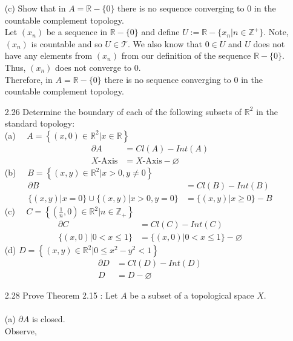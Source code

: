 \documentclass[12pt]{article}
\newcommand{\R}{\mathbb{R}}
\newcommand{\Z}{\mathbb{Z}}
\newcommand{\TT}{\mathcal{T}}
\begin{document}
\begin{enumerate}
		(c) Show that in $A=\R-\{0\}$ there is no sequence converging to 0 in the countable complement topology.\\
		Let $ (x_n) $ be a sequence in $ \R-\{0\} $ and define $ U:=\R-\{x_n|n\in\Z^+\} $. Note, $ (x_n) $ is countable and so $ U\in\TT $. We also know that $ 0\in U $ and $ U $ does not have any elements from $ (x_n) $ from our definition of the sequence $ \R-\{0\} $. \\
		Thus, $ (x_n) $ does not converge to $ 0 $.\\
		Therefore, in $A=\R-\{0\}$ there is no sequence converging to 0 in the countable complement topology.
		\item[2.26] Determine the boundary of each of the following subsets of $\mathbb{R}^{2}$ in the standard topology:\\
		(a) $\quad A=\left\{(x, 0) \in \mathbb{R}^{2} | x \in \mathbb{R}\right\}$\\
		\begin{align*}
			\partial A &= Cl(A)-Int(A)\\
			X\text{-Axis}&= X\text{-Axis}-\varnothing
		\end{align*}
		(b) $\quad B=\left\{(x, y) \in \mathbb{R}^{2} | x>0, y \neq 0\right\}$\\
		\begin{align*}
			\partial B &= Cl(B)-Int(B)\\
			\{(x,y)|x=0\}\cup\{(x,y)|x>0,y=0\}&=\{(x,y)|x\geq 0\}-B
		\end{align*}
		(c) $\quad C=\left\{\left(\frac{1}{n}, 0\right) \in \mathbb{R}^{2} | n \in \mathbb{Z}_{+}\right\}$\\
		\begin{align*}
			\partial C &= Cl(C)-Int(C)\\
			\{(x,0)|0<x\leq 1\}&=\{(x,0)|0<x\leq 1\}-\varnothing
		\end{align*}
		(d) $D=\left\{(x, y) \in \mathbb{R}^{2} | 0 \leq x^{2}-y^{2}<1\right\}$\\
		\begin{align*}
			\partial D &= Cl(D)-Int(D)\\
			D&=D-\varnothing
		\end{align*}
		\item[2.28] Prove Theorem 2.15 : Let $A$ be a subset of a topological space $X .$\\
		\\(a) $\partial A$ is closed.\\
			Observe,
			\begin{align*}

\end{align*}
\end{enumerate}
\end{document}
